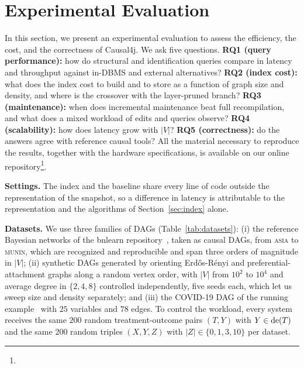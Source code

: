 \section{Experimental Evaluation}\label{sec:eval}

In this section, we present an experimental evaluation to assess the
efficiency, the cost, and the correctness of Causal4j. We ask five questions.
\textbf{RQ1 (query performance):} how do structural and identification
queries compare in latency and throughput against in-DBMS and external
alternatives? \textbf{RQ2 (index cost):} what does the index cost to build
and to store as a function of graph size and density, and where is the
crossover with the layer-pruned branch? \textbf{RQ3 (maintenance):} when does
incremental maintenance beat full recompilation, and what does a mixed
workload of edits and queries observe? \textbf{RQ4 (scalability):} how does
latency grow with $|V|$? \textbf{RQ5 (correctness):} do the answers agree
with reference causal tools? All the material necessary to reproduce the
results, together with the hardware specifications, is available on our
online repository\footnote{}.

\noindent\textbf{Settings.}  The index and the baseline share every line of code outside the
representation of the snapshot, so a difference in latency is attributable
to the representation and the algorithms of Section~\ref{sec:index} alone.

\noindent\textbf{Datasets.} We use three families of DAGs
(Table~\ref{tab:datasets}): (i) the reference Bayesian networks of the bnlearn
repository~\cite{scutari2010bnlearn}, taken as causal DAGs, from
\textsc{asia} to \textsc{munin}, which are recognized and reproducible and
span three orders of magnitude in $|V|$; (ii) synthetic DAGs generated by
orienting Erd\H{o}s-R\'enyi and preferential-attachment graphs along a
random vertex order, with $|V|$ from $10^2$ to $10^4$ and average degree in
$\{2, 4, 8\}$ controlled independently, five seeds each, which let us sweep
size and density separately; and (iii) the COVID-19 DAG of the running
example~\cite{steiger2021covid} with $25$ variables and $78$ edges. To
control the workload, every system receives the same $200$ random
treatment-outcome pairs $(T,Y)$ with $Y \in \mathrm{de}(T)$ and the same $200$
random triples $(X,Y,Z)$ with $|Z| \in \{0, 1, 3, 10\}$ per dataset.

